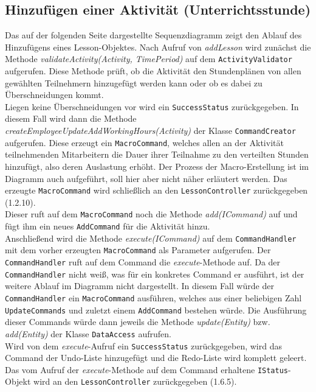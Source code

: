 \documentclass[fontsize=12pt,paper=a4,twoside]{scrartcl}
\begin{document}
\subsection{Hinzufügen einer Aktivität (Unterrichtsstunde)}
Das auf der folgenden Seite dargestellte Sequenzdiagramm zeigt den Ablauf des Hinzufügens eines Lesson-Objektes. Nach Aufruf von \textit{addLesson} wird zunächst die Methode \textit{validateActivity(Activity, TimePeriod)} auf dem \texttt{ActivityValidator} aufgerufen. Diese Methode prüft, ob die Aktivität den Stundenplänen von allen gewählten Teilnehmern hinzugefügt werden kann oder ob es dabei zu Überschneidungen kommt.\\
Liegen keine Überschneidungen vor wird ein \texttt{SuccessStatus} zurückgegeben. In diesem Fall wird dann die Methode \textit{createEmployeeUpdateAddWorkingHours(Activity)} der Klasse \texttt{CommandCreator} aufgerufen. Diese erzeugt ein \texttt{MacroCommand}, welches allen an der Aktivität teilnehmenden Mitarbeitern die Dauer ihrer Teilnahme zu den verteilten Stunden hinzufügt, also deren Auslastung erhöht. Der Prozess der Macro-Erstellung ist im Diagramm auch aufgeführt, soll hier aber nicht näher erläutert werden. Das erzeugte \texttt{MacroCommand} wird schließlich an den \texttt{LessonController} zurückgegeben (1.2.10).\\
Dieser ruft auf dem \texttt{MacroCommand} noch die Methode \textit{add(ICommand)} auf und fügt ihm ein neues \texttt{AddCommand} für die Aktivität hinzu. \\
Anschließend wird die Methode \textit{execute(ICommand)} auf dem \texttt{CommandHandler} mit dem vorher erzeugten \texttt{MacroCommand} als Parameter aufgerufen. Der \texttt{CommandHandler} ruft auf dem Command die \textit{execute}-Methode auf. Da der \texttt{CommandHandler} nicht weiß, was für ein konkretes Command er ausführt, ist der weitere Ablauf im Diagramm nicht dargestellt. In diesem Fall würde der \texttt{CommandHandler} ein \texttt{MacroCommand} ausführen, welches aus einer beliebigen Zahl \texttt{UpdateCommands} und zuletzt einem \texttt{AddCommand} bestehen würde. Die Ausführung dieser Commands würde dann jeweils die Methode \textit{update(Entity)} bzw. \textit{add(Entity)} der Klasse \texttt{DataAccess} aufrufen.\\
Wird von dem \textit{execute}-Aufruf ein \texttt{SuccessStatus} zurückgegeben, wird das Command der Undo-Liste hinzugefügt und die Redo-Liste wird komplett geleert. Das vom Aufruf der \textit{execute}-Methode auf dem Command erhaltene \texttt{IStatus}-Objekt wird an den \texttt{LessonController} zurückgegeben (1.6.5). \\
\end{document}

